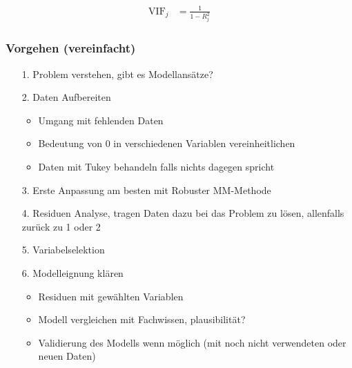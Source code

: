 \begin{align}
	\label{eq:VIF}
	\text{VIF}_j &= \frac{1}{1-R_j^2}
\end{align}

\subsubsection{Vorgehen (vereinfacht)}
\begin{itemize}
	\item [1.] Problem verstehen, gibt es Modellansätze?
	\item [2.] Daten Aufbereiten
	\begin{itemize}
		\item Umgang mit fehlenden Daten
		\item Bedeutung von 0 in verschiedenen Variablen vereinheitlichen
		\item Daten mit Tukey behandeln falls nichts dagegen spricht
	\end{itemize}
	\item [3.] Erste Anpassung am besten mit Robuster MM-Methode
	\item [4.] Residuen Analyse, tragen Daten dazu bei das Problem zu lösen, allenfalls zurück zu 1 oder 2
	\item [5.] Variabelselektion
	\item [6.] Modelleignung klären
	\begin{itemize}
		\item Residuen mit gewählten Variablen
		\item Modell vergleichen mit Fachwissen, plausibilität?
		\item Validierung des Modells wenn möglich (mit noch nicht verwendeten oder neuen Daten)
	\end{itemize}
\end{itemize}
\clearpage
